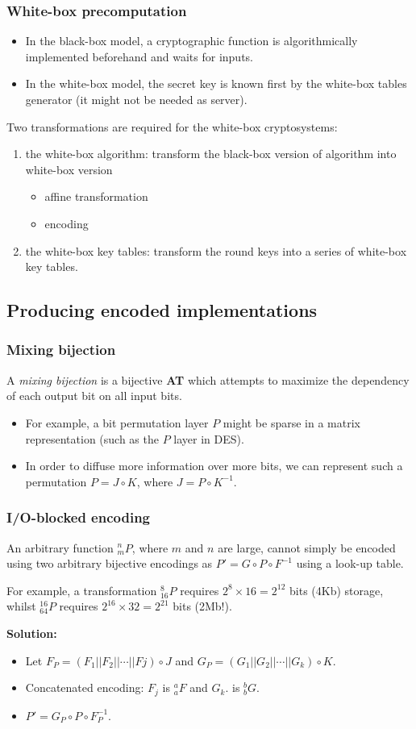 \documentclass{beamer}
\begin{document}
\frame
{
\frametitle{White-box precomputation}
\begin{itemize}
\item In the black-box model, a cryptographic function is algorithmically implemented beforehand and waits for inputs.

\item In the white-box model, the secret key is known first by the white-box tables generator (it might not be needed as server).
\end{itemize}

Two transformations are required for the white-box cryptosystems:
\begin{enumerate}
\item the white-box algorithm: transform the black-box version of algorithm into white-box version
\begin{itemize}
\item affine transformation
\item encoding
\end{itemize}
\item the white-box key tables: transform the round keys into a series of white-box key tables.
\end{enumerate}
}

\subsection{Producing encoded implementations}

\frame
{
\frametitle{Mixing bijection}
A \textit{mixing bijection} is a bijective \textbf{AT} which attempts to maximize the dependency of each output bit on all input bits.

\begin{itemize}
\item For example, a bit permutation layer $P$ might be sparse in a matrix representation (such as the $P$ layer in DES).

\item In order to diffuse more information over more bits, we can represent such a permutation $P=J \circ K$, where $J = P \circ K^{-1}$.
\end{itemize}
}

\frame
{
\frametitle{I/O-blocked encoding}
An arbitrary function $^{n}_{m}P$, where $m$ and $n$ are large, cannot simply be encoded using two arbitrary bijective encodings as $P'=G\circ P \circ F^{-1}$ using a look-up table. \newline

For example, a transformation $^{8}_{16}P$ requires $2^{8}\times 16=2^{12}$ bits (4Kb) storage, whilst $^{16}_{64}P$ requires $2^{16} \times 32=2^{21}$ bits (2Mb!).\newline

\textbf{Solution:}
\begin{itemize}
\item Let $F_{P} = (F_{1}||F_{2}||\cdots||F{j}) \circ J$ and $G_{P}=(G_{1}||G_{2}||\cdots||G_{k})\circ K$.
\item Concatenated encoding: $F_{j}$ is $^{a}_{a}F$ and $G_{k}$. is $^{b}_{b}G$.
\item $P'=G_{P}\circ P \circ F_{P}^{-1}$.
\end{itemize}
}
\end{document}
